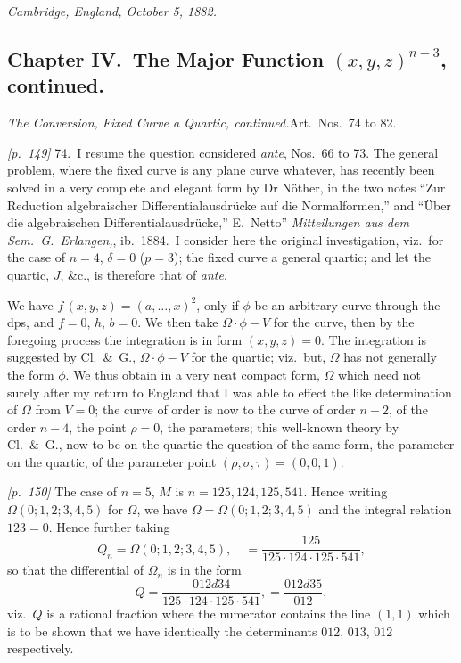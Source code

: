 \documentclass[11pt,a4paper]{article}
\theoremstyle{plain}
\theoremstyle{definition}
\theoremstyle{remark}
\begin{document}
\textit{Cambridge, England, October 5, 1882.}

\bigskip

\subsection*{Chapter IV.\ The Major Function $(x, y, z)^{n - 3}$, continued.}

\textit{The Conversion, Fixed Curve a Quartic, continued.}\quad Art.\ Nos.~74 to 82.

\noindent\textit{[p.~149]} 74.\ I resume the question considered \textit{ante}, Nos.~66 to 73. The general problem, where the fixed curve is any plane curve whatever, has recently been solved in a very complete and elegant form by Dr Nöther, in the two notes ``Zur Reduction algebraischer Differentialausdrücke auf die Normalformen,'' and ``Über die algebraischen Differentialausdrücke,'' E.\ Netto'' \textit{Mitteilungen aus dem Sem.\ G.\ Erlangen,}, ib.\ 1884.\ I consider here the original investigation, viz.\ for the case of $n = 4$, $\delta = 0$ ($p = 3$); the fixed curve a general quartic; and let the quartic, $J$, \&c., is therefore that of \textit{ante}.

We have $f\,(x, y, z) = (a, \ldots, x)^2$, only if $\phi$ be an arbitrary curve through the dps, and $f = 0$, $h$, $b = 0$. We then take $\Omega \cdot \phi - V$ for the curve, then by the foregoing process the integration is in form $(x, y, z) = 0$. The integration is suggested by Cl.\ \&\ G., $\Omega \cdot \phi - V$ for the quartic; viz.\ but, $\Omega$ has not generally the form $\phi$. We thus obtain in a very neat compact form, $\Omega$ which need not surely after my return to England that I was able to effect the like determination of $\Omega$ from $V = 0$; the curve of order is now to the curve of order $n - 2$, of the order $n - 4$, the point $\rho = 0$, the parameters; this well-known theory by Cl.\ \&\ G., now to be on the quartic the question of the same form, the parameter on the quartic, of the parameter point $(\rho, \sigma, \tau) = (0, 0, 1)$.

\bigskip\noindent\textit{[p.~150]} The case of $n = 5$, $M$ is $n = 125, 124, 125, 541$. Hence writing $\Omega(0; 1, 2; 3, 4, 5)$ for $\Omega$, we have $\Omega = \Omega(0; 1, 2; 3, 4, 5)$ and the integral relation $123 = 0$. Hence further taking
\[
Q_n = \Omega(0; 1, 2; 3, 4, 5),\quad =\frac{125}{125 \cdot 124 \cdot 125 \cdot 541},
\]
so that the differential of $\Omega_n$ is in the form
\[
Q = \frac{012 d34}{125 \cdot 124 \cdot 125 \cdot 541}, =\frac{012 d35}{012},
\]
viz.\ $Q$ is a rational fraction where the numerator contains the line $(1, 1)$ which is to be shown that we have identically the determinants $012$, $013$, $012$ respectively.
\end{document}
